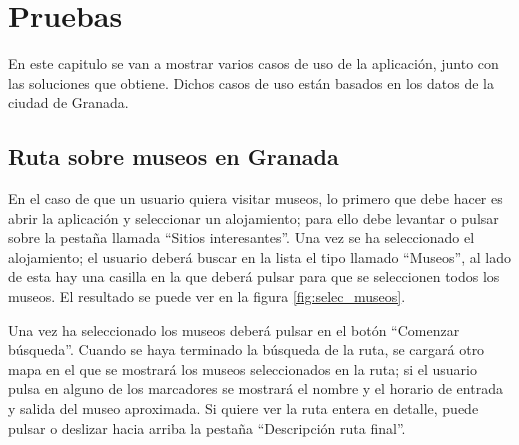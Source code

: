 \chapter{Pruebas}
En este capitulo se van a mostrar varios casos de uso de la aplicación, junto con las soluciones que obtiene. Dichos casos de uso están basados en los datos de la ciudad de Granada.

\section[Caso 1]{Ruta sobre museos en Granada}
En el caso de que un usuario quiera visitar museos, lo primero que debe hacer es abrir la aplicación y seleccionar un alojamiento; para ello debe levantar o pulsar sobre la pestaña llamada \enquote{Sitios interesantes}. Una vez se ha seleccionado el alojamiento; el usuario deberá buscar en la lista el tipo llamado \enquote{Museos}, al lado de esta hay una casilla en la que deberá pulsar para que se seleccionen todos los museos. El resultado se puede ver en la figura \ref{fig:selec_museos}.\newline

Una vez ha seleccionado los museos deberá pulsar en el botón \enquote{Comenzar búsqueda}. Cuando se haya terminado la búsqueda de la ruta, se cargará otro mapa en el que se mostrará los museos seleccionados en la ruta; si el usuario pulsa en alguno de los marcadores se mostrará el nombre y el horario de entrada y salida del museo aproximada. Si quiere ver la ruta entera en detalle, puede pulsar o deslizar hacia arriba la pestaña \enquote{Descripción ruta final}.\newline

